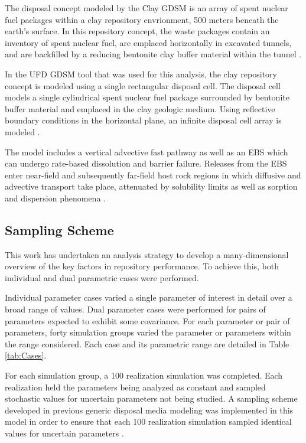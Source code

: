 The disposal concept modeled by the Clay \gls{GDSM} is an array of spent nuclear 
fuel packages within a clay repository envrionment, 500 meters beneath the 
earth's surface. In this repository concept, the waste packages contain an 
inventory of spent nuclear fuel, are emplaced horizontally in excavated tunnels, 
and are backfilled by a reducing bentonite clay buffer material within the 
tunnel \cite{nutt_generic_2009}. 

In the \gls{UFD} \gls{GDSM} tool that was used for this analysis, the clay 
repository concept is modeled using a single rectangular disposal cell. The 
disposal cell models a single cylindrical spent nuclear fuel package surrounded 
by bentonite buffer material and emplaced in the clay geologic medium. Using 
reflective boundary conditions in the horizontal plane, an infinite disposal 
cell array is modeled \cite{nutt_generic_2009}.

The model includes a vertical advective fast pathway as well as an \gls{EBS} which 
can undergo rate-based dissolution and barrier failure.  Releases from the 
\gls{EBS} enter near-field and subsequently far-field host rock regions in which 
diffusive and advective transport take place, attenuated by solubility limits as 
well as sorption and dispersion phenomena \cite{clayton_generic_2011}.

\subsection{Sampling Scheme}

This work has undertaken an analysis strategy to develop a many-dimensional 
overview of the key factors in repository performance. To achieve this, 
both individual and dual parametric cases were performed.

Individual parameter cases varied a single parameter of interest in 
detail over a broad range of values. Dual parameter cases were 
performed for pairs of parameters expected to exhibit some covariance. For 
each parameter or pair of parameters, forty simulation 
groups varied the parameter or parameters within the range considered. Each 
case and its parametric range are detailed in Table \ref{tab:Cases}. 



For each simulation group, a 100 realization simulation was completed. Each
realization held the parameters being analyzed as constant and sampled 
stochastic values for uncertain parameters not being studied.  A sampling scheme 
developed in previous generic disposal media modeling was implemented in this 
model in order to ensure that each 100 realization simulation sampled 
identical values for uncertain parameters \cite{clayton_generic_2011, 
nutt_generic_2009}.  


